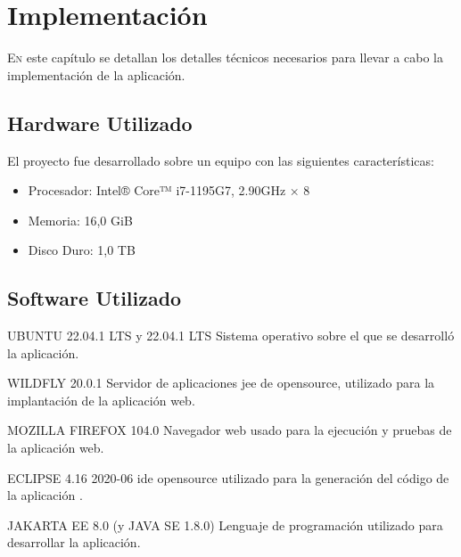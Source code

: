 \chapter{Implementación}
\label{chap:implementacion}


\lettrine{E}{n} este capítulo se detallan los detalles técnicos necesarios para llevar a cabo la implementación de la aplicación.


\section{Hardware Utilizado}
\label{sec:hw}
El proyecto fue desarrollado sobre un equipo con las siguientes características:

\begin{itemize}
\item Procesador: Intel® Core™ i7-1195G7, 2.90GHz × 8
\item Memoria: 16,0 GiB
\item Disco Duro: 1,0 TB
\end{itemize}
	

\section{Software Utilizado}
\label{sec:sw}	

 UBUNTU 22.04.1 LTS y 22.04.1 LTS\newline
 Sistema operativo sobre el que se desarrolló la aplicación.
\newline
 
 WILDFLY 20.0.1\newline
 Servidor de aplicaciones \acrshort{jee} de \gls{opensource}, utilizado para la implantación de la aplicación web.
 \newline
 
 MOZILLA FIREFOX 104.0\newline
 Navegador web usado para la ejecución y pruebas de la aplicación web.
\newline
 
 ECLIPSE 4.16 2020-06\newline
 \acrfull{ide} \gls{opensource} utilizado para la generación del código de la aplicación .
\newline
 
 JAKARTA EE 8.0 (y JAVA SE 1.8.0)\newline
 Lenguaje de programación utilizado para desarrollar la aplicación.
\newline
 

